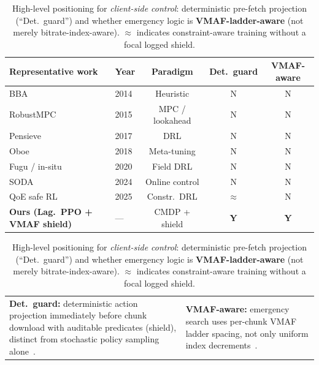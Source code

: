 \documentclass[preprint,12pt,times]{elsarticle}
\makeatletter
\newcommand{\tablebodyfont}{\small}
\newcommand{\evaltable}[1]{%
  \begingroup\tablebodyfont
  \renewcommand{\arraystretch}{1.12}%
  \setlength{\tabcolsep}{4pt}%
  #1%
  \endgroup
}
\newcommand{\tablenotecols}[2]{%
  \par\vspace{4pt}%
  {\footnotesize
  \begin{tabularx}{\linewidth}{@{}>{\raggedright\arraybackslash}X >{\raggedright\arraybackslash}X@{}}
  #1 & #2
  \end{tabularx}\par}%
}
\makeatother
\begin{document}
\begin{table}[H]
    \caption{High-level positioning for \emph{client-side control}: deterministic pre-fetch projection (``Det.\ guard'') and whether emergency logic is \textbf{VMAF-ladder-aware} (not merely bitrate-index-aware). $\approx$ indicates constraint-aware training without a focal logged shield.}
    \label{tab:rw_safety_vmaf}
    \centering
    \evaltable{%
    \setlength{\tabcolsep}{5pt}%
    \renewcommand{\arraystretch}{1.15}%
    \begin{tabular}{@{}llccc@{}}
    \toprule
    \textbf{Representative work} & \textbf{Year} & \textbf{Paradigm} & \textbf{Det.\ guard} & \textbf{VMAF-aware} \\
    \midrule
    BBA~\cite{huang2014buffer} & 2014 & Heuristic & N & N \\
    RobustMPC~\cite{yin2015control} & 2015 & MPC / lookahead & N & N \\
    Pensieve~\cite{mao2017neural} & 2017 & DRL & N & N \\
    Oboe~\cite{akhtar2018oboe} & 2018 & Meta-tuning & N & N \\
    Fugu / in-situ~\cite{yan2019learning} & 2020 & Field DRL & N & N \\
    SODA~\cite{chen2024soda} & 2024 & Online control & N & N \\
    QoE safe RL~\cite{xiao2025qoe} & 2025 & Constr.\ DRL & $\approx$ & N \\
    \textbf{Ours (Lag.\ PPO + VMAF shield)} & --- & CMDP + shield & \textbf{Y} & \textbf{Y} \\
    \bottomrule
    \end{tabular}%
    }
    \tablenotecols{%
    \textbf{Det.\ guard:} deterministic action projection immediately before chunk download with auditable predicates (shield), distinct from stochastic policy sampling alone~\cite{alshiekh2018shielding}.}{%
    \textbf{VMAF-aware:} emergency search uses per-chunk VMAF ladder spacing, not only uniform index decrements~\cite{li2016vmaf}.}%
\end{table}
\end{document}
